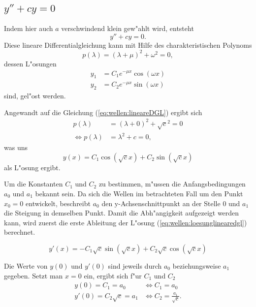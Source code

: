 \subsection{\texorpdfstring{$y''+cy = 0$}{y''+cy = 0}}
Indem hier auch $a$ verschwindend klein gew"ahlt wird, entsteht
\begin{equation}
	y''+ cy = 0.
	\label{eq:wellen:lineareDGL}
\end{equation}
Diese lineare Differentialgleichung kann mit Hilfe des charakteristischen 
Polynoms
\begin{equation*}
	p(\lambda) = (\lambda+\mu)^2+\omega^2 = 0,
\end{equation*}
dessen L"osungen
\begin{equation*}
	\begin{split}
		y_1 &= C_1e^{-\mu x}\cos(\omega x) \\
		y_2 &= C_2e^{-\mu x}\sin(\omega x)
	\end{split}
\end{equation*}
sind, gel"ost werden.

Angewandt auf die Gleichung (\ref{eq:wellen:lineareDGL}) ergibt sich
\begin{equation*}
	\begin{split}
		p(\lambda) &= (\lambda+0)^2+\sqrt{c}^2 = 0 \\
		\Leftrightarrow p(\lambda) &= \lambda^2+c = 0,
	\end{split}
\end{equation*}
was uns
\begin{equation}
	y(x) = C_1 \cos(\sqrt{c}x) + C_2 \sin(\sqrt{c}x)
	\label{eq:wellen:loesunglinearedgl}
\end{equation}
als L"osung ergibt.

Um die Konstanten $C_1$ und $C_2$ zu bestimmen, m"ussen die Anfangsbedingungen 
$a_0$ und $a_1$ bekannt sein. Da sich die Wellen im betrachteten Fall um den 
Punkt $x_0=0$ entwickelt, beschreibt $a_0$ den y-Achsenschnittpunkt an 
der Stelle $0$ und $a_1$ die Steigung in demselben Punkt. Damit die 
Abh"angigkeit aufgezeigt werden kann, wird zuerst die erste Ableitung der 
L"osung (\ref{eq:wellen:loesunglinearedgl}) berechnet.

\begin{equation}
	y'(x)=-C_1 \sqrt{c} \sin(\sqrt{c}x) + C_2 \sqrt{c} \cos(\sqrt{c}x)
\end{equation}

Die Werte von $y(0)$ und $y'(0)$ sind jeweils durch $a_0$ beziehungsweise $a_1$ 
gegeben. Setzt man $x = 0$ ein, ergibt sich f"ur $C_1$ und $C_2$
\begin{equation}
	\begin{split}
		y(0) = C_1 = a_0 &\Leftrightarrow C_1 = a_0 \\
		y'(0) = C_2 \sqrt{c} = a_1 &\Leftrightarrow C_2 = \frac{a_1}{\sqrt{c}}.
	\end{split}
\end{equation}

